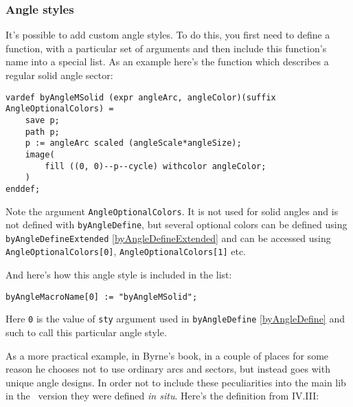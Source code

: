 \subsubsection{Angle styles}\label{AngleStyles}

	It's possible to add custom angle styles. To do this, you first need to define a function, with a particular set of arguments and then include this function's name into a special list. As an example here's the function which describes a regular solid angle sector:
	
\begin{lstlisting}
vardef byAngleMSolid (expr angleArc, angleColor)(suffix AngleOptionalColors) =
    save p;
    path p;
    p := angleArc scaled (angleScale*angleSize);
    image(
        fill ((0, 0)--p--cycle) withcolor angleColor;
    )
enddef;
\end{lstlisting}

	Note the argument \texttt{AngleOptionalColors}. It is not used for solid angles and is not defined with \texttt{byAngleDefine}, but several optional colors can be defined using \texttt{byAngleDefineExtended} \ref{byAngleDefineExtended} and can be accessed using \texttt{AngleOptionalColors[0]}, \texttt{AngleOptionalColors[1]} etc.

	And here's how this angle style is included in the list:

\begin{lstlisting}
byAngleMacroName[0] := "byAngleMSolid";
\end{lstlisting}

	Here \texttt{0} is the value of \texttt{sty} argument used in \texttt{byAngleDefine} \ref{byAngleDefine} and such to call this particular angle style.
	
	As a more practical example, in Byrne's book, in a couple of places for some reason he chooses not to use ordinary arcs and sectors, but instead goes with unique angle designs. In order not to include these peculiarities into the main lib in the \ConTeXt\ version they were defined \textit{in situ}. Here's the definition from IV.III:

	

